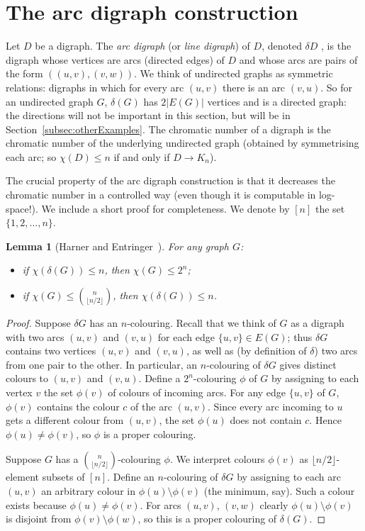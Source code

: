 \documentclass[11pt,a4paper]{scrartcl}
\numberwithin{theorem}{section}
\newtheorem{lemma}[theorem]{Lemma}
\theoremstyle{definition}
\begin{document}
	
\section{The arc digraph construction}\label{sec:arc}
Let $D$ be a digraph. The \emph{arc digraph} (or \emph{line digraph}) of $D$, denoted $\delta D$ , is the digraph whose vertices are arcs (directed edges) of $D$ and whose arcs are pairs of the form $((u,v),(v,w))$.
We think of undirected graphs as symmetric relations: digraphs in which for every arc $(u,v)$ there is an arc $(v,u)$.
So for an undirected graph $G$, $\delta(G)$ has $2|E(G)|$ vertices and is a directed graph:
the directions will not be important in this section, but will be in
Section~\ref{subsec:otherExamples}.
The chromatic number of a digraph is the chromatic number of the underlying undirected graph (obtained by symmetrising each arc; so $\chi(D) \leq n$ if and only if $D \to K_n$).

The crucial property of the arc digraph construction is that it decreases the chromatic number in a controlled way (even though it is computable in log-space!).
We include a short proof for completeness. We denote by $[n]$ the set
$\{1,2,\ldots,n\}$.

\begin{lemma}[Harner and Entringer~\cite{HarnerE72}]\label{lem:approxPoljakRodl}
	For any graph $G$:
	\begin{itemize}
		\item if $\chi(\delta(G)) \leq n$, then $\chi(G) \leq 2^n$;
		\item if $\chi(G) \leq \binom{n}{\lfloor n/2\rfloor}$, then $\chi(\delta(G)) \leq n$.
	\end{itemize}
\end{lemma}
\begin{proof}
	Suppose $\delta G$ has an $n$-colouring.
	Recall that we think of $G$ as a digraph with two arcs $(u,v)$ and $(v,u)$ for each edge $\{u,v\} \in E(G)$; thus $\delta G$ contains two vertices $(u,v)$ and $(v,u)$, as well as (by definition of $\delta$) two arcs from one pair to the other.
	In particular, an $n$-colouring of $\delta G$ gives distinct colours to $(u,v)$ and $(v,u)$.
	Define a $2^n$-colouring $\phi$ of $G$ by assigning to each vertex $v$ the set $\phi(v)$ of colours of incoming arcs.
	For any edge $\{u,v\}$ of $G$, $\phi(v)$ contains the colour $c$ of the arc $(u,v)$.
	Since every arc incoming to $u$ gets a different colour from $(u,v)$, the set $\phi(u)$ does not contain $c$.
	Hence $\phi(u) \neq \phi(v)$, so $\phi$ is a proper colouring.
	
	Suppose $G$ has a $\binom{n}{\lfloor n/2\rfloor}$-colouring $\phi$.
	We interpret colours $\phi(v)$ as $\lfloor n/2\rfloor$-element subsets of $[n]$.
	Define an $n$-colouring of $\delta G$ by assigning to each arc $(u,v)$
	an arbitrary colour in $\phi(u)\setminus \phi(v)$ (the minimum, say).
	Such a colour exists because $\phi(u) \neq \phi(v)$.
	For arcs $(u,v)$, $(v,w)$ clearly $\phi(u)\setminus \phi(v)$ is disjoint from $\phi(v) \setminus \phi(w)$, so this is a proper colouring of $\delta(G)$.
\end{proof}
\end{document}

